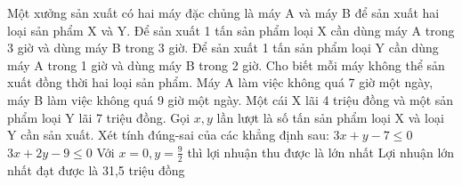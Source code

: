 \begin{ex}
 Một xưởng sản xuất có hai máy đặc chủng là máy A và máy B để sản xuất hai loại sản phẩm X và Y. Để sản xuất 1 tấn sản phẩm loại X cần dùng máy A trong 3 giờ và dùng máy B trong 3 giờ. Để sản xuất 1 tấn sản phẩm loại Y cần dùng máy A trong 1 giờ và dùng máy B trong 2 giờ. Cho biết mỗi máy không thể sản xuất đồng thời hai loại sản phẩm. Máy A làm việc không quá 7 giờ một ngày, máy B làm việc không quá 9 giờ một ngày. Một cái X lãi 4 triệu đồng và một sản phẩm loại Y lãi 7 triệu đồng. Gọi ${x,y}$ lần lượt là số tấn sản phẩm loại X và loại Y cần sản xuất. Xét tính đúng-sai của các khẳng định sau:
\choiceTFt
{ \True  $3 x + y - 7 \le 0$ }
   { \True  $3 x + 2 y - 9 \le 0$ }
     { \True  Với $x = 0, y = \frac{9}{2}$ thì lợi nhuận thu được là lớn nhất }
    { \True  Lợi nhuận lớn nhất đạt được là 31,5 triệu đồng }
\end{ex}

